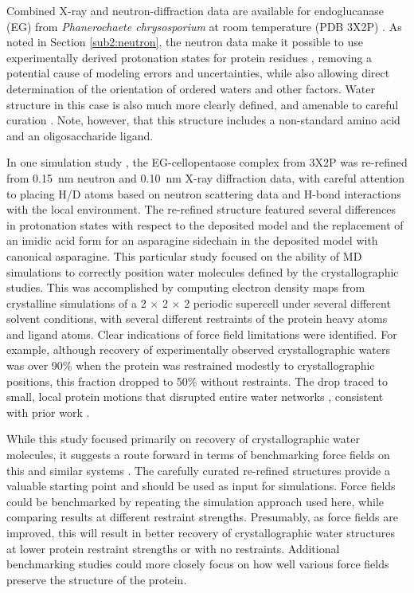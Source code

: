 \documentclass[9pt,review]{livecoms}
\begin{document}
Combined X-ray and neutron-diffraction data are available for endoglucanase (EG) from \textit{Phanerochaete chrysosporium} at room temperature (PDB 3X2P) \cite{nakamura_newtons_2015}.
As noted in Section \ref{sub2:neutron}, the neutron data make it possible to use experimentally derived protonation states for protein residues \cite{blakeley_neutron_2009,chen_direct_2012,ashkar_neutron_2018}, removing a potential cause of modeling errors and uncertainties, while also allowing direct determination of the orientation of ordered waters and other factors.
Water structure in this case is also much more clearly defined, and amenable to careful curation \cite{blakeley_15-k_2004,wall_biomolecular_2019}.
Note, however, that this structure includes a non-standard amino acid and an oligosaccharide ligand.

In one simulation study \cite{wall_biomolecular_2019}, the EG-cellopentaose complex from 3X2P was re-refined from \qty{0.15}{\nano\meter} neutron and \qty{0.10}{\nano\meter} X-ray diffraction data, with careful attention to placing H/D atoms based on neutron scattering data and H-bond interactions with the local environment.
The re-refined structure featured several differences in protonation states with respect to the deposited model and the replacement of an imidic acid form for an asparagine sidechain in the deposited model with canonical asparagine.
This particular study focused on the ability of MD simulations to correctly position water molecules defined by the crystallographic studies.
This was accomplished by computing electron density maps from crystalline simulations of a 2 $\times$ 2 $\times$ 2 periodic supercell under several different solvent conditions, with several different restraints of the protein heavy atoms and ligand atoms.
Clear indications of force field limitations were identified.
For example, although recovery of experimentally observed crystallographic waters was over 90\% when the protein was restrained modestly to crystallographic positions, this fraction dropped to 50\% without restraints.
The drop traced to small, local protein motions that disrupted entire water networks \cite{wall_biomolecular_2019}, consistent with prior work \cite{lexa_full_2011}.

While this study focused primarily on recovery of crystallographic water molecules, it suggests a route forward in terms of benchmarking force fields on this and similar systems \cite{wall_biomolecular_2019}.
The carefully curated re-refined structures provide a valuable starting point and should be used as input for simulations.
Force fields could be benchmarked by repeating the simulation approach used here, while comparing results at different restraint strengths.
Presumably, as force fields are improved, this will result in better recovery of crystallographic water structures at lower protein restraint strengths or with no restraints.
Additional benchmarking studies could more closely focus on how well various force fields preserve the structure of the protein.
\end{document}
